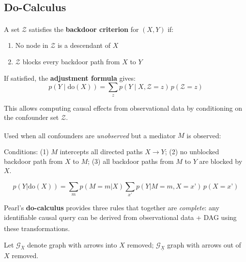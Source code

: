     \subsection{Do-Calculus}
    \begin{tcbitemize}[ skin=sectionraster ]

    \tcbitem[title=Backdoor Criterion, raster multicolumn=3]
    A set $\mathcal{Z}$ satisfies the \textbf{backdoor criterion} for
    $(X,Y)$ if:\textsuperscript{\cite[][pp.~79--81]{pearlCausalityModelsReasoning2009}}
    \begin{enumerate}
        \item No node in $\mathcal{Z}$ is a descendant of $X$
        \item $\mathcal{Z}$ blocks every backdoor path from $X$ to $Y$
    \end{enumerate}

    If satisfied, the \textbf{adjustment formula} gives:
    \begin{equation}
        p(Y \mid \mathrm{do}(X)) = \sum_{z} p(Y \mid X, \mathcal{Z}{=}z)\,p(\mathcal{Z}{=}z)
    \end{equation}

    This allows computing causal effects from observational data by conditioning
    on the confounder set $\mathcal{Z}$.

    \tcbitem[title=Front-Door Criterion, raster multicolumn=3]
    Used when all confounders are \emph{unobserved} but a mediator $M$ is
    observed:\textsuperscript{\cite[][pp.~82--84]{pearlCausalityModelsReasoning2009}}

    Conditions: (1) $M$ intercepts all directed paths $X \to Y$; (2) no
    unblocked backdoor path from $X$ to $M$; (3) all backdoor paths from $M$
    to $Y$ are blocked by $X$.

    \begin{equation}
        p(Y|\mathrm{do}(X)) = \sum_m p(M{=}m|X)
            \sum_{x’} p(Y|M{=}m, X{=}x’)\,p(X{=}x’)
    \end{equation}

    \tcbitem[title={Three Rules of Do-Calculus}, raster multicolumn=6]
    Pearl’s \textbf{do-calculus} provides three rules that together are
    \emph{complete}: any identifiable causal query can be derived from
    observational data + DAG using these
    transformations.\textsuperscript{\cite[][pp.~85--87]{pearlCausalityModelsReasoning2009}}

    Let $\mathcal{G}_{\overline{X}}$ denote graph with arrows into $X$ removed;
    $\mathcal{G}_{\underline{X}}$ graph with arrows out of $X$ removed.


\end{tcbitemize}
